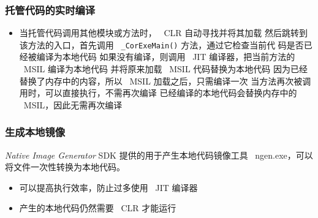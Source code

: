 \begin{frame}
\frametitle{托管代码的实时编译}
\begin{overlayarea}{\textwidth}{1.2cm}
  \begin{itemize}
  \item \small
     {当托管代码调用其他模块或方法时， ~CLR 自动寻找并将其加载}
     {然后跳转到该方法的入口，首先调用 ~\texttt{\_CorExeMain()} 方法，通过它检查当前代
      码是否已经被编译为本地代码}
     {如果没有编译，则调用 ~JIT 编译器，把当前方法的 ~MSIL 编译为本地代码}
     {并将原来加载 ~MSIL 代码替换为本地代码}
     {因为已经替换了内存中的内容，所以 ~MSIL 加载之后，只需编译一次 }
     {当方法再次被调用时，可以直接执行，不需再次编译}
     {已经编译的本地代码会替换内存中的 ~MSIL，因此无需再次编译}
  \end{itemize}
\end{overlayarea}

\begin{figure}[h] 
  \centering 
\end{figure}

\end{frame}

\begin{frame}
\frametitle{生成本地镜像}
\begin{block}{\textit{Native Image Generator}}
  \CJKindent \small SDK 提供的用于产生本地代码镜像工具 ~ngen.exe，可以将文件一次性转换为本地代码。
\end{block}
\vskip4pt
\vskip4pt
\begin{itemize}
\item 可以提高执行效率，防止过多使用 ~JIT 编译器
\item 产生的本地代码仍然需要 ~CLR 才能运行
\end{itemize}

\end{frame}

